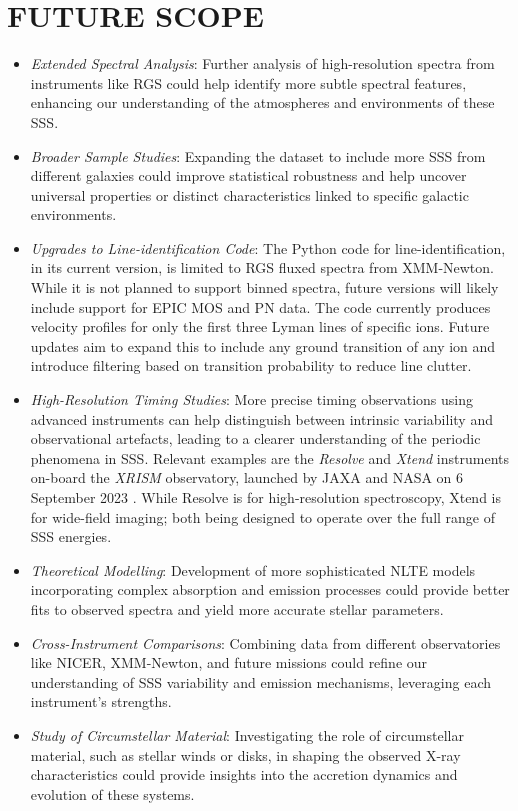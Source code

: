     \section{\MakeUppercase{Future Scope}}
    	\begin{itemize}
    		\item \textit{Extended Spectral Analysis}: Further analysis of high-resolution spectra from instruments like RGS could help identify more subtle spectral features, enhancing our understanding of the atmospheres and environments of these SSS.
    		
    		\item \textit{Broader Sample Studies}: Expanding the dataset to include more SSS from different galaxies could improve statistical robustness and help uncover universal properties or distinct characteristics linked to specific galactic environments.
    		
    		\item \textit{Upgrades to Line-identification Code}: The Python code for line-identification, in its current version, is limited to RGS fluxed spectra from XMM-Newton. While it is not planned to support binned spectra, future versions will likely include support for EPIC MOS and PN data. The code currently produces velocity profiles for only the first three Lyman lines of specific ions. Future updates aim to expand this to include any ground transition of any ion and introduce filtering based on transition probability to reduce line clutter.
    		
    		\item \textit{High-Resolution Timing Studies}: More precise timing observations using advanced instruments can help distinguish between intrinsic variability and observational artefacts, leading to a clearer understanding of the periodic phenomena in SSS. Relevant examples are the \textit{Resolve} and \textit{Xtend} instruments on-board the \textit{XRISM} observatory, launched by JAXA and NASA on 6 September 2023 \cite{tashiro2022xrism}. While Resolve is for high-resolution spectroscopy, Xtend is for wide-field imaging; both being designed to operate over the full range of SSS energies.
    		
    		\item \textit{Theoretical Modelling}: Development of more sophisticated NLTE models incorporating complex absorption and emission processes could provide better fits to observed spectra and yield more accurate stellar parameters.
    		
    		\item \textit{Cross-Instrument Comparisons}: Combining data from different observatories like NICER, XMM-Newton, and future missions could refine our understanding of SSS variability and emission mechanisms, leveraging each instrument's strengths.
    		
    		\item \textit{Study of Circumstellar Material}: Investigating the role of circumstellar material, such as stellar winds or disks, in shaping the observed X-ray characteristics could provide insights into the accretion dynamics and evolution of these systems.
    	\end{itemize}
    	
	\setcounter{footnotecount}{\value{footnote}}